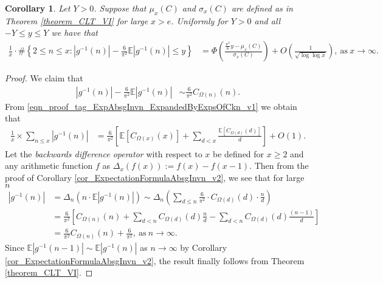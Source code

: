 \documentclass[11pt,reqno,a4letter]{article}
\numberwithin{figure}{section}
\numberwithin{table}{section}
\theoremstyle{plain}
\newtheorem{cor}[theorem]{Corollary}
\numberwithin{theorem}{section}
\theoremstyle{definition}
\begin{document}
\begin{cor} 
\label{cor_CLT_VII} 
Let $Y > 0$. Suppose that $\mu_x(C)$ and $\sigma_x(C)$ are defined as in 
Theorem \ref{theorem_CLT_VI} for large $x > e$. 
Uniformly for $Y > 0$ and all $-Y \leq y \leq Y$ 
we have that 
\begin{align*} 
\frac{1}{x} \cdot \#\left\{2 \leq n \leq x:|g^{-1}(n)| - 
     \frac{6}{\pi^2} \mathbb{E}|g^{-1}(n)| \leq y\right\} & = 
     \Phi\left(\frac{\frac{\pi^2}{6} y - \mu_x(C)}{\sigma_x(C)}\right) + 
     O\left(\frac{1}{\sqrt{\log\log x}}\right), 
     \mathrm{\ as\ } x \rightarrow \infty. 
\end{align*} 
\end{cor} 
\begin{proof} 
We claim that 
\begin{align*} 
|g^{-1}(n)| - \frac{6}{\pi^2} \mathbb{E}|g^{-1}(n)| & \sim \frac{6}{\pi^2} C_{\Omega(n)}(n). 
\end{align*} 
From \eqref{eqn_proof_tag_ExpAbsgInvn_ExpandedByExpsOfCkn_v1}
we obtain that 
\begin{align*} 
\frac{1}{x} \times \sum_{n \leq x} |g^{-1}(n)| & = 
     \frac{6}{\pi^2} \left[\mathbb{E}[C_{\Omega(x)}(x)] + \sum_{d<x} 
     \frac{\mathbb{E}[C_{\Omega(d)}(d)]}{d}\right] + O(1). 
\end{align*} 
Let the \emph{backwards difference operator} with respect to $x$ 
be defined for $x \geq 2$ and any arithmetic function $f$ as 
$\Delta_x(f(x)) := f(x) - f(x-1)$. Then from the proof of 
Corollary \ref{cor_ExpectationFormulaAbsgInvn_v2}, 
we see that for large $n$ 
\begin{align*} 
|g^{-1}(n)| & = \Delta_n(n \cdot \mathbb{E}|g^{-1}(n)|) 
     \sim \Delta_n\left(\sum_{d \leq n} \frac{6}{\pi^2} \cdot C_{\Omega(d)}(d) \cdot \frac{n}{d}\right) \\ 
     & = \frac{6}{\pi^2}\left[C_{\Omega(n)}(n) + \sum_{d < n} C_{\Omega(d)}(d) \frac{n}{d} - 
     \sum_{d<n} C_{\Omega(d)}(d) \frac{(n-1)}{d}\right] \\ 
     & = \frac{6}{\pi^2} C_{\Omega(n)}(n) + \frac{6}{\pi^2} , 
     \mathrm{\ as\ } n \rightarrow \infty. 
\end{align*} 
Since $\mathbb{E}|g^{-1}(n-1)| \sim \mathbb{E}|g^{-1}(n)|$ as $n \rightarrow \infty$ by 
Corollary \ref{cor_ExpectationFormulaAbsgInvn_v2}, 
the result finally follows from Theorem \ref{theorem_CLT_VI}. 
\end{proof} 
\end{document}
